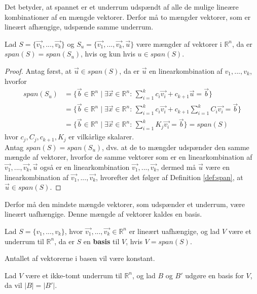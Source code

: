 Det betyder, at spannet er et underrum udspændt af alle de mulige lineære kombinationer af en mængde vektorer. 
Derfor må to mængder vektorer, som er lineært afhængige, udspænde samme underrum.
\begin{stn}
Lad $S = \{\vec{v_1},...,\vec{v_k}\}$ og $S_u = \{\vec{v_1},...,\vec{v_k}, \vec{u}\}$ være mængder af vektorer i $\mathds{R}^n$, da er $span(S) = span(S_u)$, hvis og kun hvis $u \in span(S)$.
\label{stn:akvivalentespan}
\end{stn}
\begin{proof}
Antag først, at $\vec{u} \in span(S)$, da er $\vec{u}$ en linearkombination af $v_1,..., v_k$, hvorfor
\begin{align*}
span(S_u) &= \{ \vec{b} \in \mathds{R}^n\mid \exists \vec{x} \in \mathds{R}^n: \, \sum_{i=1}^k c_i \vec{v_i} + c_{k+1} \vec{u}  =\vec{b}\}
\\&= \{ \vec{b} \in \mathds{R}^n\mid \exists \vec{x} \in \mathds{R}^n: \, \sum_{i=1}^k c_i \vec{v_i} + c_{k+1} \sum_{i=1}^k C_i \vec{v_i} = \vec{b}\}
\\&= \{ \vec{b} \in \mathds{R}^n\mid \exists \vec{x} \in \mathds{R}^n: \, \sum_{i=1}^k K_j \vec{v_i} = \vec{b}\} = span(S)
\end{align*}
hvor $c_j, C_j, c_{k+1}, K_j$ er vilkårlige skalarer.
\\ Antag $span(S) = span(S_u)$, dvs. at de to mængder udspænder den samme mængde af vektorer, hvorfor de samme vektorer som er en linearkombination af $\vec{v_1},...,\vec{v_k}, \vec{u}$ også er en linearkombination $\vec{v_1},..., \vec{v_k}$, dermed må $\vec{u}$ være en linearkombination af  $\vec{v_1},..., \vec{v_k}$, hvorefter det følger af Definition \ref{def:span}, at $\vec{u} \in span(S)$.
\end{proof}
Derfor må den mindste mængde vektorer, som udspænder et underrum, være lineært uafhængige.
Denne mængde af vektorer kaldes en basis.
\begin{defn}[Basis]
Lad $S =\{v_1,...,v_k\}$, hvor $\vec{v_1},...,\vec{v_k} \in \mathds{R}^n$ er lineært uafhængige, og lad $V$ være et underrum til $\mathds{R}^n$, da er $S$ en \textbf{basis} til $V$, hvis $V = span(S)$.
\label{def:basis}
\end{defn}
Antallet af vektorerne i basen vil være konstant.
\begin{stn}
Lad $V$ være et ikke-tomt underrum til $\mathds{R}^n$, og lad $B$ og $B'$ udgøre en basis for $V$, da vil $|B|=|B'|$.
\label{stn:basiskardinalitet}
\end{stn}

